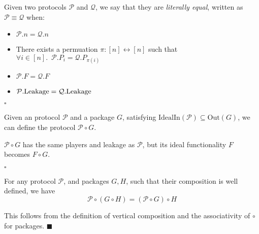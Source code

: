 \begin{definition}
Given two protocols $\mathcal{P}$ and $\mathcal{Q}$, we say that
they are \emph{literally equal}, written as $\mathcal{P} \equiv \mathcal{Q}$
when:
\begin{itemize}
\item $\mathcal{P}.n = \mathcal{Q}.n$
\item There exists a permuation $\pi : [n] \leftrightarrow [n]$ such that
$
{\forall i \in [n].\enspace \mathcal{P}.P_i = \mathcal{Q}.P_{\pi(i)}}
$
\item $\mathcal{P}.F = \mathcal{Q}.F$
\item $\mathcal{P}.\text{Leakage} = \mathcal{Q}.\text{Leakage}$
\end{itemize}

$\square$
\end{definition}

\begin{definition}
Given an protocol $\mathcal{P}$ and a package $G$, satisfying
$\text{IdealIn}(\mathcal{P}) \subseteq \text{Out}(G)$,
we can define the protocol $\mathcal{P} \circ G$.

$\mathcal{P} \circ G$ has the same players and leakage as $\mathcal{P}$,
but its ideal functionality $F$ becomes $F \circ G$.

$\square$
\end{definition}

\begin{claim}
For any protocol $\mathcal{P}$, and packages $G, H$, such that their composition
is well defined, we have
$$
\mathcal{P} \circ (G \circ H) = (\mathcal{P} \circ G) \circ H
$$

 This follows from the definition of vertical composition
and the associativity of $\circ$ for packages.
$\blacksquare$
\end{claim}

